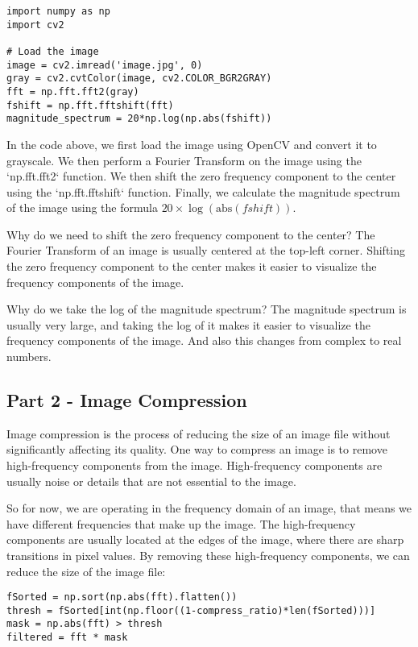 \documentclass[a3paper,12pt]{extarticle} %
\begin{document}
\begin{verbatim}
import numpy as np
import cv2

# Load the image
image = cv2.imread('image.jpg', 0)
gray = cv2.cvtColor(image, cv2.COLOR_BGR2GRAY)
fft = np.fft.fft2(gray)
fshift = np.fft.fftshift(fft)
magnitude_spectrum = 20*np.log(np.abs(fshift))
\end{verbatim}

In the code above, we first load the image using OpenCV and convert it to grayscale. We then perform a Fourier Transform on the image using the `np.fft.fft2` function. We then shift the zero frequency component to the center using the `np.fft.fftshift` function. Finally, we calculate the magnitude spectrum of the image using the formula $20 \times \log(\text{abs}(fshift))$.

Why do we need to shift the zero frequency component to the center? The Fourier Transform of an image is usually centered at the top-left corner. Shifting the zero frequency component to the center makes it easier to visualize the frequency components of the image.

Why do we take the log of the magnitude spectrum? The magnitude spectrum is usually very large, and taking the log of it makes it easier to visualize the frequency components of the image. And also this changes from complex to real numbers.

\subsection{Part 2 - Image Compression}

Image compression is the process of reducing the size of an image file without significantly affecting its quality. One way to compress an image is to remove high-frequency components from the image. High-frequency components are usually noise or details that are not essential to the image.

So for now, we are operating in the frequency domain of an image, that means we have different frequencies that make up the image. The high-frequency components are usually located at the edges of the image, where there are sharp transitions in pixel values. By removing these high-frequency components, we can reduce the size of the image file:

\begin{verbatim}
fSorted = np.sort(np.abs(fft).flatten())
thresh = fSorted[int(np.floor((1-compress_ratio)*len(fSorted)))]
mask = np.abs(fft) > thresh
filtered = fft * mask
\end{verbatim}
\end{document}
